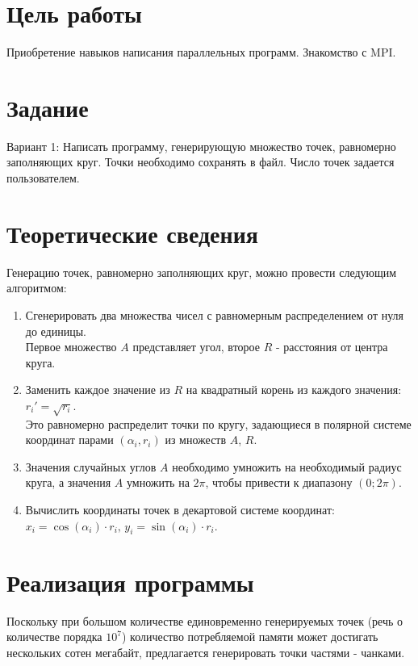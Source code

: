 \documentclass[12pt,a4paper]{article}
\begin{document}
\makeqtitle
\setcounter{page}{2}

\section{Цель работы}

Приобретение навыков написания параллельных программ. Знакомство с MPI.

\section{Задание}

Вариант 1: Написать программу, генерирующую множество точек, равномерно
заполняющих круг. Точки необходимо сохранять в файл. Число точек задается
пользователем.

\section{Теоретические сведения}

Генерацию точек, равномерно заполняющих круг, можно провести следующим алгоритмом:

\begin{enumerate}
    \item Сгенерировать два множества чисел с равномерным распределением от нуля до единицы. \\
          Первое множество $A$ представляет угол, второе $R$ - расстояния от центра круга.
    \item Заменить каждое значение из $R$ на квадратный корень из каждого значения: $r_i' = \sqrt{r_i}$. \\
          Это равномерно распределит точки по кругу, задающиеся в полярной системе координат
          парами $(\alpha_i, r_i)$ из множеств $A$, $R$.
    \item Значения случайных углов $A$ необходимо умножить на необходимый радиус круга,
          а значения $A$ умножить на $2\pi$, чтобы привести к диапазону $(0; 2\pi)$.
    \item Вычислить координаты точек в декартовой системе координат: $x_i = \cos(\alpha_i) \cdot r_i,\, y_i = \sin(\alpha_i) \cdot r_i$.
\end{enumerate}


\section{Реализация программы}

Поскольку при большом количестве единовременно генерируемых точек (речь о количестве порядка $10^7$)
количество потребляемой памяти может достигать нескольких сотен мегабайт, предлагается
генерировать точки частями - чанками.
\end{document}
